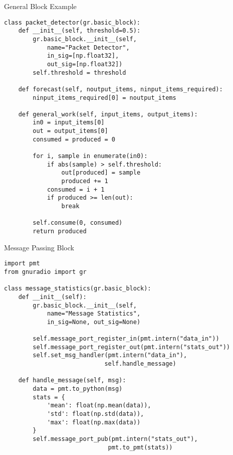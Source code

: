 \documentclass[aspectratio=169,11pt]{beamer}
\begin{document}
\begin{frame}[fragile]{General Block Example}
\begin{verbatim}
class packet_detector(gr.basic_block):
    def __init__(self, threshold=0.5):
        gr.basic_block.__init__(self,
            name="Packet Detector",
            in_sig=[np.float32],
            out_sig=[np.float32])
        self.threshold = threshold
    
    def forecast(self, noutput_items, ninput_items_required):
        ninput_items_required[0] = noutput_items
    
    def general_work(self, input_items, output_items):
        in0 = input_items[0]
        out = output_items[0]
        consumed = produced = 0
        
        for i, sample in enumerate(in0):
            if abs(sample) > self.threshold:
                out[produced] = sample
                produced += 1
            consumed = i + 1
            if produced >= len(out):
                break
        
        self.consume(0, consumed)
        return produced
\end{verbatim}
\end{frame}

\begin{frame}[fragile]{Message Passing Block}
\begin{verbatim}
import pmt
from gnuradio import gr

class message_statistics(gr.basic_block):
    def __init__(self):
        gr.basic_block.__init__(self,
            name="Message Statistics",
            in_sig=None, out_sig=None)
        
        self.message_port_register_in(pmt.intern("data_in"))
        self.message_port_register_out(pmt.intern("stats_out"))
        self.set_msg_handler(pmt.intern("data_in"), 
                            self.handle_message)
    
    def handle_message(self, msg):
        data = pmt.to_python(msg)
        stats = {
            'mean': float(np.mean(data)),
            'std': float(np.std(data)),
            'max': float(np.max(data))
        }
        self.message_port_pub(pmt.intern("stats_out"),
                             pmt.to_pmt(stats))
\end{verbatim}
\end{frame}
\end{document}
